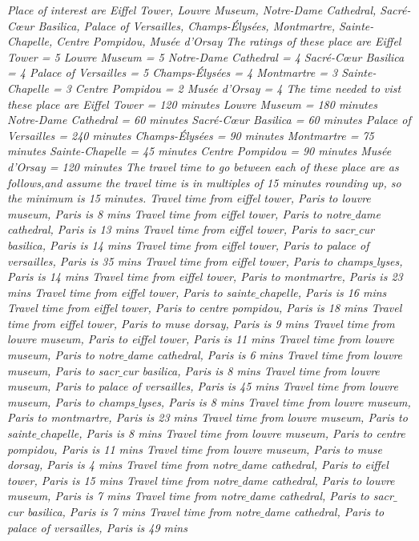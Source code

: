 \documentclass[doubleblind]{ecai}
\begin{document}
\textit{Place of interest are 
Eiffel Tower, Louvre Museum, Notre-Dame Cathedral, Sacré-Cœur Basilica, Palace of Versailles, Champs-Élysées, Montmartre, Sainte-Chapelle, Centre Pompidou, Musée d'Orsay
 The ratings of these place are 
Eiffel Tower = 5
Louvre Museum = 5
Notre-Dame Cathedral = 4
Sacré-Cœur Basilica = 4
Palace of Versailles = 5
Champs-Élysées = 4
Montmartre = 3
Sainte-Chapelle = 3
Centre Pompidou = 2
Musée d'Orsay = 4
 The time needed to vist these place are 
Eiffel Tower = 120 minutes
Louvre Museum = 180 minutes
Notre-Dame Cathedral = 60 minutes
Sacré-Cœur Basilica = 60 minutes
Palace of Versailles = 240 minutes
Champs-Élysées = 90 minutes
Montmartre = 75 minutes
Sainte-Chapelle = 45 minutes
Centre Pompidou = 90 minutes
Musée d'Orsay = 120 minutes
 The travel time to go between each of these place are as follows,and assume the travel time is in multiples of 15 minutes rounding up, so the minimum is 15 minutes.
Travel time from eiffel tower, Paris to louvre museum, Paris is 8 mins
Travel time from eiffel tower, Paris to notre$\_$dame cathedral, Paris is 13 mins
Travel time from eiffel tower, Paris to sacr$\_$cur basilica, Paris is 14 mins
Travel time from eiffel tower, Paris to palace of versailles, Paris is 35 mins
Travel time from eiffel tower, Paris to champs$\_$lyses, Paris is 14 mins
Travel time from eiffel tower, Paris to montmartre, Paris is 23 mins
Travel time from eiffel tower, Paris to sainte$\_$chapelle, Paris is 16 mins
Travel time from eiffel tower, Paris to centre pompidou, Paris is 18 mins
Travel time from eiffel tower, Paris to muse dorsay, Paris is 9 mins
Travel time from louvre museum, Paris to eiffel tower, Paris is 11 mins
Travel time from louvre museum, Paris to notre$\_$dame cathedral, Paris is 6 mins
Travel time from louvre museum, Paris to sacr$\_$cur basilica, Paris is 8 mins
Travel time from louvre museum, Paris to palace of versailles, Paris is 45 mins
Travel time from louvre museum, Paris to champs$\_$lyses, Paris is 8 mins
Travel time from louvre museum, Paris to montmartre, Paris is 23 mins
Travel time from louvre museum, Paris to sainte$\_$chapelle, Paris is 8 mins
Travel time from louvre museum, Paris to centre pompidou, Paris is 11 mins
Travel time from louvre museum, Paris to muse dorsay, Paris is 4 mins
Travel time from notre$\_$dame cathedral, Paris to eiffel tower, Paris is 15 mins
Travel time from notre$\_$dame cathedral, Paris to louvre museum, Paris is 7 mins
Travel time from notre$\_$dame cathedral, Paris to sacr$\_$cur basilica, Paris is 7 mins
Travel time from notre$\_$dame cathedral, Paris to palace of versailles, Paris is 49 mins
}
\end{document}
